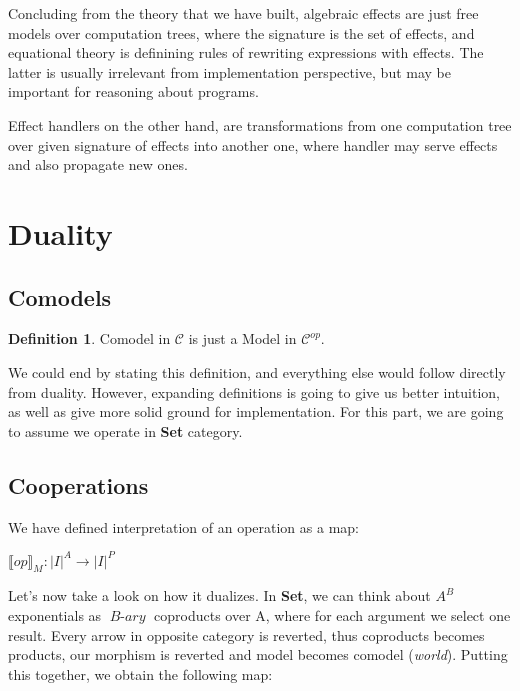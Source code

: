 \documentclass[declaration,shortabstract]{iithesis}
\theoremstyle{definition} \newtheorem{definition}{Definition}[chapter]
\theoremstyle{remark} \newtheorem{remark}[definition]{Observation}
\theoremstyle{plain} \newtheorem{theorem}[definition]{Theorem}
\theoremstyle{plain} \newtheorem{lemma}[definition]{Lemma}
\newcommand{\mathVar}[1]{{\operatorname{\mathit{#1}}}}
\begin{document}
Concluding from the theory that we have built, algebraic effects are just free
models over computation trees, where the signature is the set of effects, and
equational theory is definining rules of rewriting expressions with effects.
The latter is usually irrelevant from implementation perspective, but may be
important for reasoning about programs.

Effect handlers on the other hand, are transformations from one computation
tree over given signature of effects into another one, where handler may serve
effects and also propagate new ones.

\section{Duality}
    \subsection{Comodels}

    \begin{definition}
        Comodel in $\mathcal{C}$ is just a Model in $ \mathcal{C}^{op} $.
    \end{definition}

    We could end by stating this definition, and everything else would follow
    directly from duality. However, expanding definitions is going to give us
    better intuition, as well as give more solid ground for implementation.
    For this part, we are going to assume we operate in \textbf{Set} category.

    \subsection{Cooperations}

    We have defined interpretation of an operation as a map:

    \begin{center}
        $ {\llbracket op \rrbracket}_M : {|I|}^{A} \rightarrow |I|^{P} $
    \end{center}

    \noindent
    Let's now take a look on how it dualizes. In \textbf{Set}, we can think about
    $A^{B}$ exponentials as $\mathVar{B-ary}$ coproducts over A, where for each
    argument we select one result. Every arrow in opposite category is reverted,
    thus coproducts becomes products, our morphism is reverted and model becomes
    comodel (\textit{world}). Putting this together, we obtain the following map:
\end{document}
